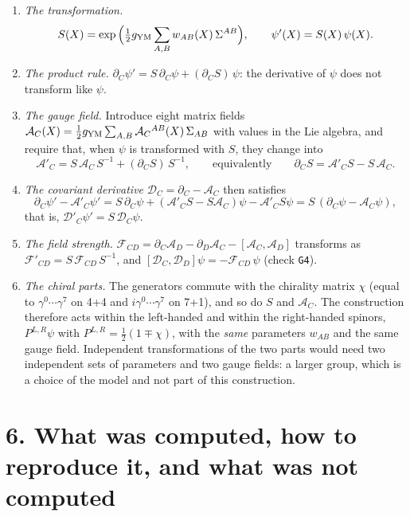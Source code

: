 \documentclass[
  10pt,
]{article}
\providecommand{\tightlist}{%
  \setlength{\itemsep}{0pt}\setlength{\parskip}{0pt}}
\begin{document}
\begin{enumerate}
\def\labelenumi{\arabic{enumi}.}
\tightlist
\item
  \emph{The transformation.}
  \[S(X)=\exp\Big(\tfrac12g_{\rm YM}\sum_{A,B}w_{AB}(X)\,\Sigma^{AB}\Big),\qquad\psi'(X)=S(X)\,\psi(X).\]
\item
  \emph{The product rule.}
  \(\partial_C\psi'=S\,\partial_C\psi+(\partial_CS)\,\psi\): the
  derivative of \(\psi\) does not transform like \(\psi\).
\item
  \emph{The gauge field.} Introduce eight matrix fields
  \(\mathcal A_C(X)=\tfrac12g_{\rm YM}\sum_{A,B}\mathcal A_C{}^{AB}(X)\,\Sigma_{AB}\)
  with values in the Lie algebra, and require that, when \(\psi\) is
  transformed with \(S\), they change into
  \[\mathcal A'_C=S\,\mathcal A_C\,S^{-1}+(\partial_CS)\,S^{-1},\qquad\text{equivalently}\qquad\partial_CS=\mathcal A'_CS-S\,\mathcal A_C .\]
\item
  \emph{The covariant derivative}
  \(\mathcal D_C=\partial_C-\mathcal A_C\) then satisfies
  \[\partial_C\psi'-\mathcal A'_C\psi'=S\,\partial_C\psi+(\mathcal A'_CS-S\mathcal A_C)\psi-\mathcal A'_CS\psi=S\,(\partial_C\psi-\mathcal A_C\psi),\]
  that is, \(\mathcal D'_C\psi'=S\,\mathcal D_C\psi\).
\item
  \emph{The field strength.}
  \(\mathcal F_{CD}=\partial_C\mathcal A_D-\partial_D\mathcal A_C-[\mathcal A_C,\mathcal A_D]\)
  transforms as \(\mathcal F'_{CD}=S\,\mathcal F_{CD}\,S^{-1}\), and
  \([\mathcal D_C,\mathcal D_D]\psi=-\mathcal F_{CD}\,\psi\) (check
  \texttt{G4}).
\item
  \emph{The chiral parts.} The generators commute with the chirality
  matrix \(\chi\) (equal to \(\gamma^{0}\cdots\gamma^{7}\) on 4+4 and
  \(i\gamma^{0}\cdots\gamma^{7}\) on 7+1), and so do \(S\) and
  \(\mathcal A_C\). The construction therefore acts within the
  left-handed and within the right-handed spinors, \(P^{L,R}\psi\) with
  \(P^{L,R}=\tfrac12(1\mp\chi)\), with the \emph{same} parameters
  \(w_{AB}\) and the same gauge field. Independent transformations of
  the two parts would need two independent sets of parameters and two
  gauge fields: a larger group, which is a choice of the model and not
  part of this construction.
\end{enumerate}

\hypertarget{what-was-computed-how-to-reproduce-it-and-what-was-not-computed}{%
\section{6. What was computed, how to reproduce it, and what was not
computed}\label{what-was-computed-how-to-reproduce-it-and-what-was-not-computed}}
\end{document}
